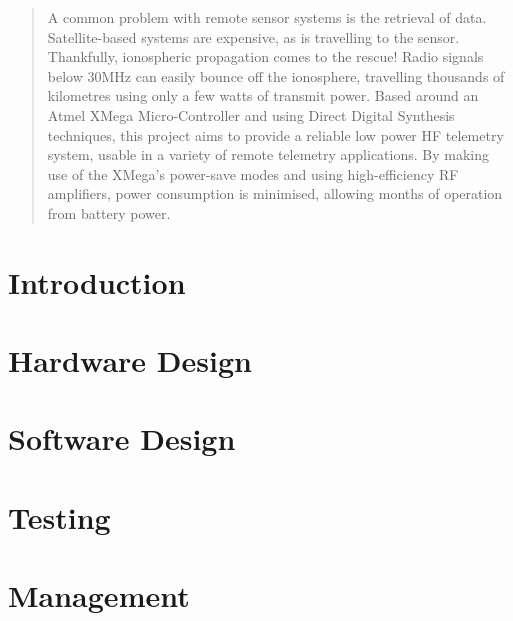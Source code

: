 \documentclass[a4paper,12pt]{article}
\begin{document}
\newpage
 \thispagestyle{empty}
 \vspace*{\fill}
\begin{abstract}
\noindent
A common problem with remote sensor systems is the retrieval of data. Satellite-based systems are expensive, as is travelling to the sensor. Thankfully, ionospheric propagation comes to the rescue! Radio signals below 30MHz can easily bounce off the ionosphere, travelling thousands of kilometres using only a few watts of transmit power.
Based around an Atmel XMega Micro-Controller and using Direct Digital Synthesis techniques, this project aims to provide a reliable low power HF telemetry system, usable in a variety of remote telemetry applications. 
By making use of the XMega's power-save modes and using high-efficiency RF amplifiers, power consumption is minimised, allowing months of operation from battery power.
\end{abstract}
\vspace*{\fill}
\newpage
\tableofcontents
\newpage

\section{Introduction}

\section{Hardware Design}

\section{Software Design}

\section{Testing}

\section{Management}
\end{document}
